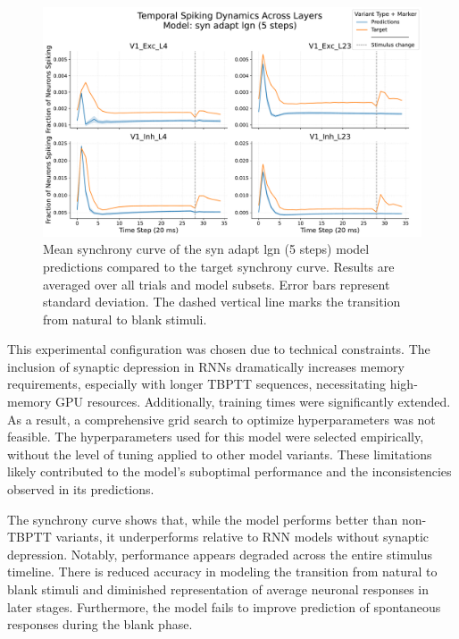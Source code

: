 \begin{figure}
    \centering
    \includegraphics[width=\linewidth]{img/plots/separate_model_synchrony_curve_syn_only_lgn_5_evaluation.pdf}
    \caption{Mean synchrony curve of the syn adapt lgn (5 steps) model predictions compared to the target synchrony curve. Results are averaged over all trials and model subsets. Error bars represent standard deviation. The dashed vertical line marks the transition from natural to blank stimuli.}
    \label{fig:synchrony_curve_syn_adapt_lgn_5}
\end{figure}

This experimental configuration was chosen due to technical constraints. The inclusion of synaptic depression in RNNs dramatically increases memory requirements, especially with longer TBPTT sequences, necessitating high-memory GPU resources. Additionally, training times were significantly extended. As a result, a comprehensive grid search to optimize hyperparameters was not feasible. The hyperparameters used for this model were selected empirically, without the level of tuning applied to other model variants. These limitations likely contributed to the model's suboptimal performance and the inconsistencies observed in its predictions.

The synchrony curve shows that, while the model performs better than non-TBPTT variants, it underperforms relative to RNN models without synaptic depression. Notably, performance appears degraded across the entire stimulus timeline. There is reduced accuracy in modeling the transition from natural to blank stimuli and diminished representation of average neuronal responses in later stages. Furthermore, the model fails to improve prediction of spontaneous responses during the blank phase.

